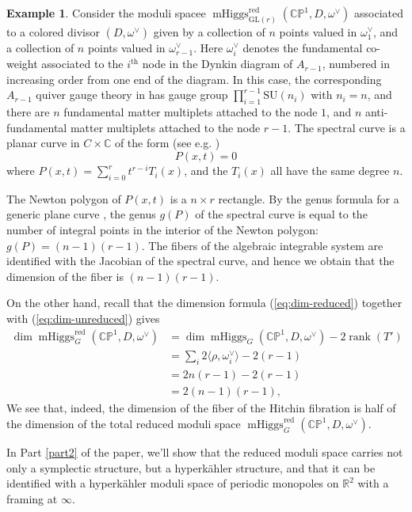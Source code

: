 \documentclass[11pt, oneside, reqno]{amsart}
\theoremstyle{definition} \newtheorem{definition}{Definition}[section]
\theoremstyle{definition} \newtheorem{remark}[definition]{Remark}
\theoremstyle{definition} \newtheorem{remarks}[definition]{Remarks}
\theoremstyle{definition} \newtheorem{question}[definition]{Question}
\theoremstyle{definition} \newtheorem*{note}{Note}
\theoremstyle{definition} \newtheorem{example}[definition]{Example}
\theoremstyle{definition} \newtheorem{examples}[definition]{Examples}
\newcommand{\bb}[1]{\mathbb{#1}}
\newcommand{\mr}[1]{\mathrm{#1}}
\newcommand{\RR}{\mathbb{R}}
\newcommand{\GL}{\mathrm{GL}}
\newcommand{\SU}{\mathrm{SU}}
\DeclareMathOperator{\rank}{rank}
\DeclareMathOperator{\mhiggs}{mHiggs}
\newcommand{\red}{\mathrm{red}}
\begin{document}
\begin{example}
Consider the moduli spacee $\mhiggs^\red_{\GL(r)}(\bb{CP}^1, D, \omega^\vee)$ associated to a colored divisor $(D, \omega^\vee)$
given by a collection of $n$ points valued in $\omega_1^{\vee}$, and a collection of $n$ points valued in $\omega_{r-1}^{\vee}$.  Here $\omega_i^{\vee}$ denotes the fundamental co-weight associated to the $i^\mr{th}$ node in the Dynkin diagram of $A_{r-1}$, numbered in increasing order from one end of the diagram. In this case, the corresponding $A_{r-1}$ quiver gauge theory in \cite{NekrasovPestun} has gauge group $\prod_{i=1}^{r-1} \SU(n_i)$ with $n_i = n$, and there are $n$ fundamental matter multiplets attached to the node $1$, and $n$ anti-fundamental matter multiplets attached to the node $r-1$. The spectral curve is a planar curve in $C \times \mathbb{C}$ of the form (see e.g. \cite{NekrasovPestun})
\[P(x,t) = 0\]
where $P(x,t) = \sum_{i=0}^{r} t^{r-i} T_{i}(x)$, and the $T_i(x)$ all have the same degree $n$.

The Newton polygon of $P(x,t)$ is a $n \times r$ rectangle. By the genus formula for a generic plane curve \cite{Baker, Khovanskii}, the genus $g(P)$ of the spectral curve is equal to the number of integral points in the interior of the Newton polygon: $g(P) = (n-1)(r-1)$. The fibers of the algebraic integrable system are identified with the Jacobian of the spectral curve, and hence we obtain that
the dimension of the fiber is $(n-1)(r-1)$.

On the other hand, recall that the dimension formula (\ref{eq:dim-reduced}) together with (\ref{eq:dim-unreduced}) gives
\begin{align*}
  \dim \mhiggs^\red_G(\bb{CP}^1, D, \omega^\vee) &=  \dim \mhiggs_{G}(\bb{CP}^1, D, \omega^\vee) - 2 \rank (T') \\
  &= \sum_{i} 2 \langle \rho, \omega_i^{\vee} \rangle  - 2 (r-1)  \\
  &= 2 n (r - 1)  - 2(r - 1) \\ 
  &= 2(n-1)(r-1),
\end{align*}
 We see that, indeed, the dimension of the fiber of the Hitchin fibration is half of the dimension of the total reduced moduli space $\mhiggs^{\red}_{G}(\bb{CP}^1, D, \omega^\vee)$. 
\end{example}

In Part \ref{part2} of the paper, we'll show that the reduced moduli space carries not only a symplectic structure, but a hyperk\"ahler structure, and that it can be identified with a hyperk\"ahler moduli space of periodic monopoles on $\RR^2$ with a framing at $\infty$.
\end{document}
